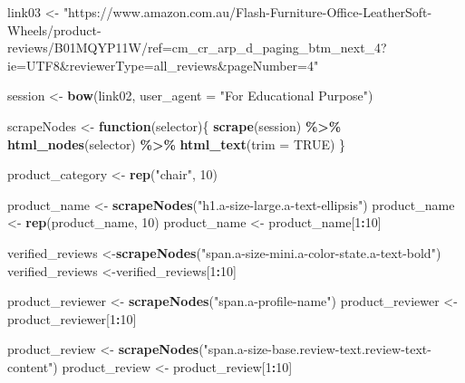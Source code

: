 \documentclass[
]{article}
\newenvironment{Shaded}{\begin{snugshade}}{\end{snugshade}}
\newcommand{\AttributeTok}[1]{\textcolor[rgb]{0.13,0.29,0.53}{#1}}
\newcommand{\ConstantTok}[1]{\textcolor[rgb]{0.56,0.35,0.01}{#1}}
\newcommand{\ControlFlowTok}[1]{\textcolor[rgb]{0.13,0.29,0.53}{\textbf{#1}}}
\newcommand{\DecValTok}[1]{\textcolor[rgb]{0.00,0.00,0.81}{#1}}
\newcommand{\FunctionTok}[1]{\textcolor[rgb]{0.13,0.29,0.53}{\textbf{#1}}}
\newcommand{\NormalTok}[1]{#1}
\newcommand{\OtherTok}[1]{\textcolor[rgb]{0.56,0.35,0.01}{#1}}
\newcommand{\SpecialCharTok}[1]{\textcolor[rgb]{0.81,0.36,0.00}{\textbf{#1}}}
\newcommand{\StringTok}[1]{\textcolor[rgb]{0.31,0.60,0.02}{#1}}
\begin{document}
\begin{Shaded}
\begin{Highlighting}[]
\NormalTok{link03 }\OtherTok{\textless{}{-}} \StringTok{"https://www.amazon.com.au/Flash{-}Furniture{-}Office{-}LeatherSoft{-}Wheels/product{-}reviews/B01MQYP11W/ref=cm\_cr\_arp\_d\_paging\_btm\_next\_4?ie=UTF8\&reviewerType=all\_reviews\&pageNumber=4"}


\NormalTok{  session }\OtherTok{\textless{}{-}} \FunctionTok{bow}\NormalTok{(link02,}
               \AttributeTok{user\_agent =} \StringTok{"For Educational Purpose"}\NormalTok{)}

\NormalTok{  scrapeNodes }\OtherTok{\textless{}{-}} \ControlFlowTok{function}\NormalTok{(selector)\{}
    \FunctionTok{scrape}\NormalTok{(session) }\SpecialCharTok{\%\textgreater{}\%}
      \FunctionTok{html\_nodes}\NormalTok{(selector) }\SpecialCharTok{\%\textgreater{}\%}
      \FunctionTok{html\_text}\NormalTok{(}\AttributeTok{trim =} \ConstantTok{TRUE}\NormalTok{)}
\NormalTok{  \}}

\NormalTok{  product\_category }\OtherTok{\textless{}{-}} \FunctionTok{rep}\NormalTok{(}\StringTok{"chair"}\NormalTok{, }\DecValTok{10}\NormalTok{)}

\NormalTok{  product\_name }\OtherTok{\textless{}{-}} \FunctionTok{scrapeNodes}\NormalTok{(}\StringTok{"h1.a{-}size{-}large.a{-}text{-}ellipsis"}\NormalTok{)}
\NormalTok{  product\_name }\OtherTok{\textless{}{-}} \FunctionTok{rep}\NormalTok{(product\_name, }\DecValTok{10}\NormalTok{)}
\NormalTok{  product\_name }\OtherTok{\textless{}{-}}\NormalTok{ product\_name[}\DecValTok{1}\SpecialCharTok{:}\DecValTok{10}\NormalTok{]}
  
\NormalTok{  verified\_reviews }\OtherTok{\textless{}{-}}\FunctionTok{scrapeNodes}\NormalTok{(}\StringTok{"span.a{-}size{-}mini.a{-}color{-}state.a{-}text{-}bold"}\NormalTok{)}
\NormalTok{  verified\_reviews }\OtherTok{\textless{}{-}}\NormalTok{verified\_reviews[}\DecValTok{1}\SpecialCharTok{:}\DecValTok{10}\NormalTok{]}
  
\NormalTok{  product\_reviewer }\OtherTok{\textless{}{-}} \FunctionTok{scrapeNodes}\NormalTok{(}\StringTok{"span.a{-}profile{-}name"}\NormalTok{)}
\NormalTok{  product\_reviewer }\OtherTok{\textless{}{-}}\NormalTok{ product\_reviewer[}\DecValTok{1}\SpecialCharTok{:}\DecValTok{10}\NormalTok{]}
  
\NormalTok{  product\_review }\OtherTok{\textless{}{-}} \FunctionTok{scrapeNodes}\NormalTok{(}\StringTok{"span.a{-}size{-}base.review{-}text.review{-}text{-}content"}\NormalTok{)}
\NormalTok{  product\_review }\OtherTok{\textless{}{-}}\NormalTok{ product\_review[}\DecValTok{1}\SpecialCharTok{:}\DecValTok{10}\NormalTok{]}
  

\end{Highlighting}
\end{Shaded}
\end{document}
